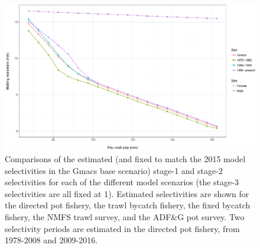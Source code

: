 \documentclass[]{article}
\begin{document}
\begin{figure}[htbp]
\centering
\includegraphics{bbrkc_files/figure-latex/growth_inc-1.pdf}
\caption{Comparisons of the estimated (and fixed to match the 2015 model
selectivities in the Gmacs base scenario) stage-1 and stage-2
selectivities for each of the different model scenarios (the stage-3
selectivities are all fixed at 1). Estimated selectivities are shown for
the directed pot fishery, the trawl bycatch fishery, the fixed bycatch
fishery, the NMFS trawl survey, and the ADF\&G pot survey. Two
selectivity periods are estimated in the directed pot fishery, from
1978-2008 and 2009-2016.\label{fig:growth_inc}}
\end{figure}
\end{document}
